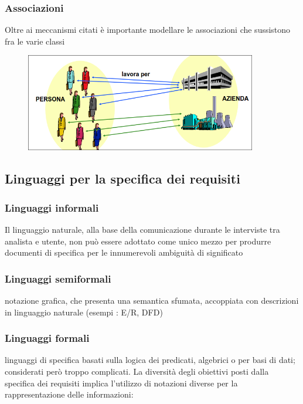\documentclass{report}
\begin{document}
                \subsubsection{Associazioni}
                    Oltre ai meccanismi citati è importante modellare le associazioni che sussistono fra le varie classi 
                    \begin{figure}[H]
                        \includegraphics[width=0.9\textwidth]{img/ass.png}
                    \end{figure}
            \subsection{Linguaggi per la specifica dei requisiti}
                \subsubsection{Linguaggi informali}
                    Il linguaggio naturale, alla base della comunicazione durante le interviste tra analista e utente, non può essere adottato come unico mezzo per produrre documenti di specifica per le innumerevoli ambiguità di significato
                \subsubsection{Linguaggi semiformali}
                    notazione grafica, che presenta una semantica sfumata, accoppiata con descrizioni in linguaggio naturale (esempi : E/R, DFD)
                \subsubsection{Linguaggi formali}
                    linguaggi di specifica basati sulla logica dei predicati, algebrici o per basi di dati; considerati però troppo complicati.
                La diversità degli obiettivi posti dalla specifica dei requisiti implica l'utilizzo di notazioni diverse per la rappresentazione delle informazioni:
\end{document}
